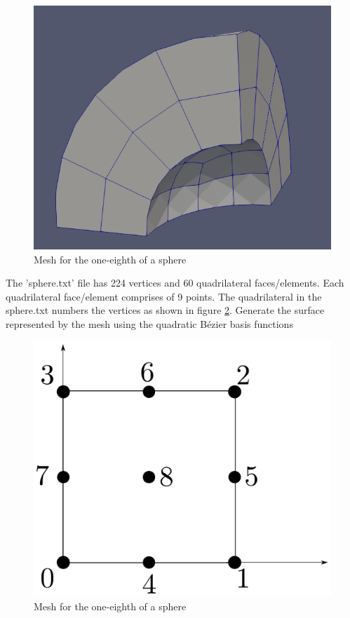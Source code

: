 \documentclass[a4paper, 11pt]{article}
\begin{document}
\begin{enumerate}
\begin{figure}
\includegraphics[scale=0.35]{resources/sphere.png} 
\centering
\caption{Mesh for the one-eighth of a sphere}
\label{fig:sphereFig}
\end{figure}

The 'sphere.txt' file has 224 vertices and 60 quadrilateral faces/elements. Each quadrilateral face/element comprises of 9 points. The quadrilateral in the sphere.txt numbers the vertices as shown in figure \ref{fig:sphereNodeNumber}. Generate the surface represented by the mesh  using the quadratic B\'{e}zier basis functions
\begin{figure}
\includegraphics[scale=0.35]{resources/quadraticSquareElement.pdf} 
\centering
\caption{Mesh for the one-eighth of a sphere}
\label{fig:sphereNodeNumber} 
\end{figure}


\end{enumerate}
\end{document}
